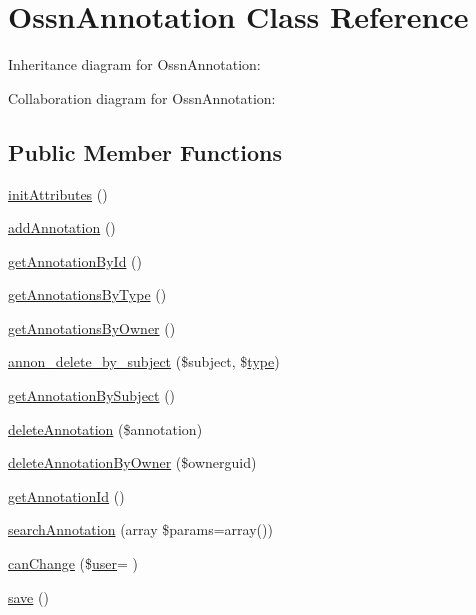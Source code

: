 \hypertarget{class_ossn_annotation}{}\section{Ossn\+Annotation Class Reference}
\label{class_ossn_annotation}


Inheritance diagram for Ossn\+Annotation\+:


Collaboration diagram for Ossn\+Annotation\+:
\subsection*{Public Member Functions}
\begin{DoxyCompactItemize}
\item 
\hyperlink{class_ossn_annotation_a5fee6794de13185987b790fce43d0883}{init\+Attributes} ()
\item 
\hyperlink{class_ossn_annotation_a47cd22e5c53a181b96cf29be370234ad}{add\+Annotation} ()
\item 
\hyperlink{class_ossn_annotation_a81010169311fc08b1027ab1402c07b16}{get\+Annotation\+By\+Id} ()
\item 
\hyperlink{class_ossn_annotation_a952a987cb2d3b815deba7f46327d3c98}{get\+Annotations\+By\+Type} ()
\item 
\hyperlink{class_ossn_annotation_aff8dba7d75dd0f6d34e84a675b05d923}{get\+Annotations\+By\+Owner} ()
\item 
\hyperlink{class_ossn_annotation_a42989c2fb919e792bea4ff3677ae6974}{annon\+\_\+delete\+\_\+by\+\_\+subject} (\$subject, \$\hyperlink{_ossn_wall_2actions_2wall_2post_2group_8php_a2dc1bb4e1ed0029daa81ac0776b14b51}{type})
\item 
\hyperlink{class_ossn_annotation_ad7c55d183a4daa02021a1c40b3b6bf21}{get\+Annotation\+By\+Subject} ()
\item 
\hyperlink{class_ossn_annotation_a5079c98fc58063c2ff8e1e9560eac0f4}{delete\+Annotation} (\$annotation)
\item 
\hyperlink{class_ossn_annotation_aadd1b94e0c646ad7914868046150e5f1}{delete\+Annotation\+By\+Owner} (\$ownerguid)
\item 
\hyperlink{class_ossn_annotation_a2a164093fee97379c5b93b66832e28ac}{get\+Annotation\+Id} ()
\item 
\hyperlink{class_ossn_annotation_afba62ee7e1ea979b1a9896e7bc610f96}{search\+Annotation} (array \$params=array())
\item 
\hyperlink{class_ossn_annotation_a05804a6fe9cab2e6bb201030fabfa357}{can\+Change} (\$\hyperlink{ossn_8config_8db_8example_8php_a802544b7ba9f79bbf24ef67773d53bed}{user}= \textquotesingle{}\textquotesingle{})
\item 
\hyperlink{class_ossn_annotation_afc8a3c62679cf00ade9f15fb2a6d6132}{save} ()
\end{DoxyCompactItemize}
